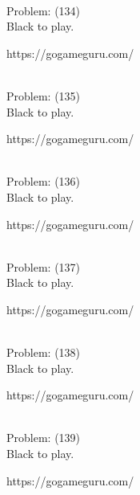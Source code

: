 \documentclass[11pt]{article}
\begin{document}
\begin{minipage}[t]{0.5\textwidth}
  {\centering
  
\\
  Problem: (134)\\
  Black to play.

https://gogameguru.com/\\
  }
\end{minipage}
\begin{minipage}[t]{0.5\textwidth}
  {\centering
  
\\
  Problem: (135)\\
  Black to play.

https://gogameguru.com/\\
  }
\end{minipage}
\begin{minipage}[t]{0.5\textwidth}
  {\centering
  
\\
  Problem: (136)\\
  Black to play.

https://gogameguru.com/\\
  }
\end{minipage}
\begin{minipage}[t]{0.5\textwidth}
  {\centering
  
\\
  Problem: (137)\\
  Black to play.

https://gogameguru.com/\\
  }
\end{minipage}
\begin{minipage}[t]{0.5\textwidth}
  {\centering
  
\\
  Problem: (138)\\
  Black to play.

https://gogameguru.com/\\
  }
\end{minipage}
\begin{minipage}[t]{0.5\textwidth}
  {\centering
  
\\
  Problem: (139)\\
  Black to play.

https://gogameguru.com/\\
  }
\end{minipage}
\end{document}
